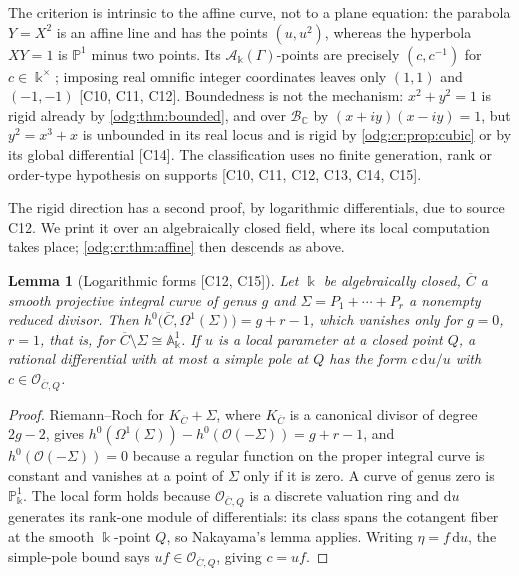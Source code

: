 \documentclass[11pt,oneside]{article}
\numberwithin{equation}{section}
\newtheorem{lemma}[lemma]{Lemma}
\theoremstyle{definition}
\theoremstyle{remark}
\newcommand{\C}{\mathbb C}
\newcommand{\BC}{\mathcal B_{\C}}
\newcommand{\src}[1]{\textup{\textsf{\small[#1]}}}
\newcommand{\crA}{\mathcal A_\Bbbk(\Gamma)}
\newcommand{\Aff}{\mathbb A}
\newcommand{\dif}{\mathrm d}
\begin{document}
The criterion is intrinsic to the affine curve, not to a plane equation: the
parabola $Y=X^2$ is an affine line and has the points $(u,u^2)$, whereas the
hyperbola $XY=1$ is $\mathbb P^1$ minus two points. Its $\crA$-points are precisely
$(c,c^{-1})$ for $c\in\Bbbk^\times$; imposing real omnific integer coordinates
leaves only $(1,1)$ and $(-1,-1)$ \src{C10, C11, C12}. Boundedness is not the mechanism:
$x^2+y^2=1$ is rigid already by \cref{odg:thm:bounded}, and over $\BC$ by
$(x+iy)(x-iy)=1$, but $y^2=x^3+x$ is unbounded in its real locus and is rigid by
\cref{odg:cr:prop:cubic} or by its global differential \src{C14}. The classification
uses no finite generation, rank or order-type hypothesis on supports
\src{C10, C11, C12, C13, C14, C15}.

The rigid direction has a second proof, by logarithmic differentials, due to
source C12. We print it over an algebraically closed field, where its local
computation takes place; \cref{odg:cr:thm:affine} then descends as above.

\begin{lemma}[Logarithmic forms \src{C12, C15}]\label{odg:cr:lem:logdim}
Let $\Bbbk$ be algebraically closed, $\overline C$ a smooth projective integral curve of genus
$g$ and $\Sigma=P_1+\cdots+P_r$ a nonempty reduced divisor. Then
$h^0\bigl(\overline C,\Omega^1(\Sigma)\bigr)=g+r-1$, which vanishes only for $g=0$,
$r=1$, that is, for $\overline C\setminus\Sigma\cong\Aff^1_\Bbbk$. If $u$ is a local
parameter at a closed point $Q$, a rational differential with at most a simple pole at $Q$
has the form $c\,\dif u/u$ with $c\in\mathcal O_{\overline C,Q}$.
\end{lemma}
\begin{proof}
Riemann--Roch for $K_{\overline C}+\Sigma$, where $K_{\overline C}$ is a canonical
divisor of degree $2g-2$, gives $h^0(\Omega^1(\Sigma))-h^0(\mathcal O(-\Sigma))=g+r-1$,
and $h^0(\mathcal O(-\Sigma))=0$ because a regular function on the proper integral
curve is constant and vanishes at a point of $\Sigma$ only if it is zero. A curve of
genus zero is $\mathbb P^1_\Bbbk$. The local form holds because
$\mathcal O_{\overline C,Q}$ is a discrete valuation ring and $\dif u$ generates
its rank-one module of differentials: its class spans the cotangent fiber at
the smooth $\Bbbk$-point $Q$, so Nakayama's lemma applies. Writing $\eta=f\,\dif u$,
the simple-pole bound says $uf\in\mathcal O_{\overline C,Q}$, giving $c=uf$.
\end{proof}
\end{document}
